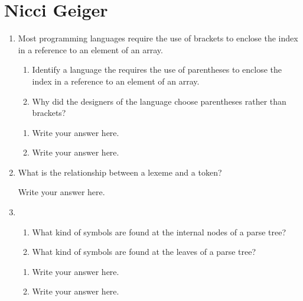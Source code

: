
\chapter{Nicci Geiger}

\begin{enumerate}
  \item Most programming languages require the use of brackets to
    enclose the index in a reference to an element of an array.
  \begin{enumerate}
    \item Identify a language the requires the use of parentheses
      to enclose the index in a reference to an element of an array.
    \item Why did the designers of the language choose parentheses
      rather than brackets?
    \end{enumerate}

  \begin{answer}

  \begin{enumerate}
    \item Write your answer here.
    \item Write your answer here.
    \end{enumerate}

    \end{answer}
    
  \item What is the relationship between a lexeme and a token?

  \begin{answer}

    Write your answer here.

    \end{answer}

  \item
  \begin{enumerate}
    \item What kind of symbols are found at the internal nodes of a
      parse tree?
    \item What kind of symbols are found at the leaves of a parse tree?
    \end{enumerate}

  \begin{answer}

  \begin{enumerate}
    \item Write your answer here.
    \item Write your answer here.
    \end{enumerate}


\end{answer}
\end{enumerate}
